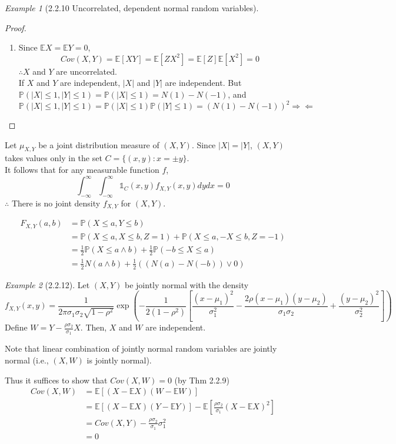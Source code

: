 \documentclass[12pt]{report}
\renewcommand{\1}{\mathbb{1}}
\theoremstyle{break}
\theoremstyle{newdef}
\theoremstyle{remark}
\newtheorem*{exmp}{Example} %
\begin{document}
\begin{appendices}
\begin{exmp}[2.2.10 Uncorrelated, dependent normal random variables]
\begin{proof}
\begin{enumerate}
\item
Since $\mathbb{E}X = \mathbb{E}Y = 0$,
$$Cov(X,Y) = \mathbb{E}[XY] = \mathbb{E}[ZX^2] = \mathbb{E}[Z]\mathbb{E}[X^2] = 0$$
$\therefore X$ and $Y$ are uncorrelated.\\
If $X$ and $Y$ are independent, $|X|$ and $|Y|$ are independent.
But $\mathbb{P}(|X| \leq 1, |Y| \leq 1) = \mathbb{P}(|X| \leq 1) = N(1) - N(-1)$, and $\mathbb{P}(|X| \leq 1, |Y| \leq 1) = \mathbb{P}(|X| \leq 1) \mathbb{P}(|Y| \leq 1) = (N(1)-N(-1))^2
\Rightarrow\!\Leftarrow$

\end{enumerate}
\end{proof}

Let $\mu_{X,Y}$ be a joint distribution measure of $(X,Y)$.
Since $|X| = |Y|$, $(X,Y)$ takes values only in the set
$C = \{(x,y): x = \pm y\}$.\\
It follows that for any measurable function $f$,
$$
\int_{-\infty}^\infty \int_{-\infty}^\infty \mathbb{1}_C(x,y) f_{X,Y}(x,y) dydx = 0
$$
$\therefore$ There is no joint density $f_{X,Y}$ for $(X,Y)$.


$$
\begin{aligned}
F_{X,Y}(a,b) &= \mathbb{P}(X \leq a, Y \leq b)\\
&= \mathbb{P}(X \leq a, X \leq b, Z = 1) + \mathbb{P}(X \leq a, -X \leq b, Z = -1)\\
&= \frac{1}{2} \mathbb{P}(X \leq a \wedge b) + \frac{1}{2}\mathbb{P}(-b \leq X \leq a)\\
&= \frac{1}{2} N(a \wedge b) + \frac{1}{2} ((N(a)-N(-b)) \vee 0)
\end{aligned}
$$
\end{exmp}

\begin{exmp}[2.2.12]
Let $(X,Y)$ be jointly normal with the density
$$
f_{X,Y}(x,y) = \frac{1}{2\pi \sigma_1\sigma_2 \sqrt{1-\rho^2}}
\exp \left(-\frac{1}{2(1-\rho^2)} \left[\frac{(x-\mu_1)^2}{\sigma_1^2} - \frac{2\rho(x-\mu_1)(y-\mu_2)}{\sigma_1\sigma_2} + \frac{(y-\mu_2)^2}{\sigma_2^2}\right]\right)$$
Define $W = Y - \frac{\rho\sigma_2}{\sigma_1} X$.
Then, $X$ and $W$ are independent.

Note that linear combination of jointly normal random variables are jointly normal
(i.e., $(X,W)$ is jointly normal).

Thus it suffices to show that $Cov(X,W) = 0$ (by Thm 2.2.9)
$$
\begin{aligned}
Cov(X,W) &= \mathbb{E}[(X-\mathbb{E}X)(W-\mathbb{E}W)]\\
&= \mathbb{E}[(X-\mathbb{E}X)(Y-\mathbb{E}Y)] - \mathbb{E}[\frac{\rho\sigma_2}{\sigma_1}(X-\mathbb{E}X)^2]\\
&= Cov(X,Y) - \frac{\rho\sigma_2}{\sigma_1}\sigma_1^2\\
&= 0
\end{aligned}
$$


\end{exmp}
\end{appendices}
\end{document}
